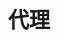 \documentclass[class=book, crop=false]{standalone}
\begin{document}
\begin{CJK}{UTF8}{gbsn}

\chapter{代理}





\cleardoublepage

\end{CJK}
\end{document}
